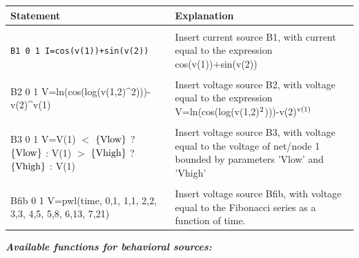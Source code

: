 \begin{longtable}{l l}
Statement & Explanation \\ [0.5ex]
\hline \\ %

\begin{minipage}{15em}
\texttt{B1 0 1 I=cos(v(1))+sin(v(2))}
\end{minipage}& 
\begin{minipage}{20em}
Insert current source B1, with current equal to the expression cos(v(1))+sin(v(2))
\end{minipage}
\\ \\

\begin{minipage}{15em}
B2 0 1 V=ln(cos(log(v(1,2)\^{}2)))-v(2)\^{}v(1)
\end{minipage} &
\begin{minipage}{20em}
Insert voltage source B2, with voltage equal to the expression V=ln(cos(log(v(1,2)$\rm{^2}$)))-v(2)$\rm{^{v(1)}}$
\end{minipage}
\\ \\

\begin{minipage}{15em}
B3 0 1 V=V(1) $<$ $\left\{\rm{Vlow}\right\}$ ? $\left\{\rm{Vlow}\right\}$ : V(1) $>$ $\left\{\rm{Vhigh}\right\}$ ? $\left\{\rm{Vhigh}\right\}$ : V(1)
\end{minipage} &
\begin{minipage}{20em}
Insert voltage source B3, with voltage equal to the voltage of net/node 1 bounded by parameters 'Vlow' and 'Vhigh'
\end{minipage}
\\ \\

\begin{minipage}{15em}
Bfib 0 1 V=pwl({time}, 0,1, 1,1, 2,2, 3,3, 4,5, 5,8, 6,13, 7,21)
\end{minipage} &
\begin{minipage}{20em}
Insert voltage source Bfib, with voltage equal to the Fibonacci series as a function of time.
\end{minipage}

\end{longtable}

\textbf{\textit{Available functions for behavioral sources:}}

